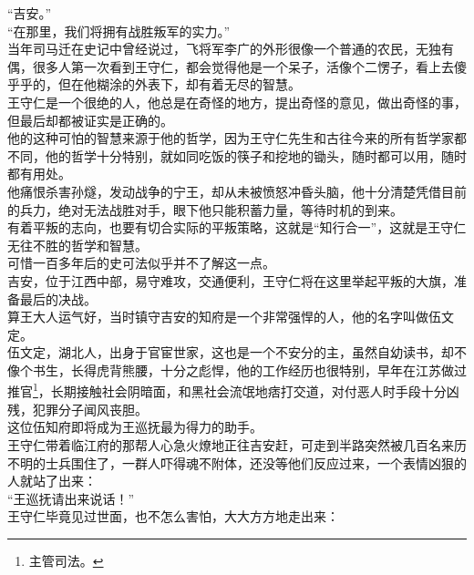 \begin{multicols}{\theparacolNo}
“吉安。”\\

“在那里，我们将拥有战胜叛军的实力。”\\

当年司马迁在史记中曾经说过，飞将军李广的外形很像一个普通的农民，无独有偶，很多人第一次看到王守仁，都会觉得他是一个呆子，活像个二愣子，看上去傻乎乎的，但在他糊涂的外表下，却有着无尽的智慧。\\

王守仁是一个很绝的人，他总是在奇怪的地方，提出奇怪的意见，做出奇怪的事，但最后却都被证实是正确的。\\

他的这种可怕的智慧来源于他的哲学，因为王守仁先生和古往今来的所有哲学家都不同，他的哲学十分特别，就如同吃饭的筷子和挖地的锄头，随时都可以用，随时都有用处。\\

他痛恨杀害孙燧，发动战争的宁王，却从未被愤怒冲昏头脑，他十分清楚凭借目前的兵力，绝对无法战胜对手，眼下他只能积蓄力量，等待时机的到来。\\

有着平叛的志向，也要有切合实际的平叛策略，这就是“知行合一”，这就是王守仁无往不胜的哲学和智慧。\\

可惜一百多年后的史可法似乎并不了解这一点。\\

吉安，位于江西中部，易守难攻，交通便利，王守仁将在这里举起平叛的大旗，准备最后的决战。\\

算王大人运气好，当时镇守吉安的知府是一个非常强悍的人，他的名字叫做伍文定。\\

伍文定，湖北人，出身于官宦世家，这也是一个不安分的主，虽然自幼读书，却不像个书生，长得虎背熊腰，十分之彪悍，他的工作经历也很特别，早年在江苏做过推官\footnote{主管司法。}，长期接触社会阴暗面，和黑社会流氓地痞打交道，对付恶人时手段十分凶残，犯罪分子闻风丧胆。\\

这位伍知府即将成为王巡抚最为得力的助手。\\

王守仁带着临江府的那帮人心急火燎地正往吉安赶，可走到半路突然被几百名来历不明的士兵围住了，一群人吓得魂不附体，还没等他们反应过来，一个表情凶狠的人就站了出来：\\

“王巡抚请出来说话！”\\

王守仁毕竟见过世面，也不怎么害怕，大大方方地走出来：\\


\end{multicols}
